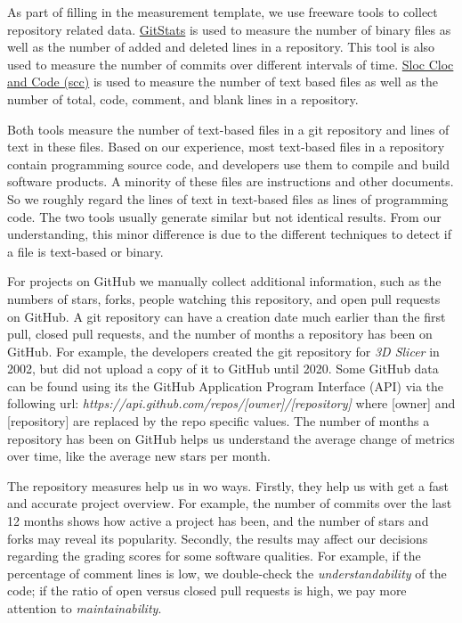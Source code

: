 \documentclass[final, 3p, times, authoryear]{elsarticle}
\begin{document}
As part of filling in the measurement template, we use freeware tools to collect
repository related data. \href{https://github.com/tomgi/git_stats}{GitStats}
\citep{Gieniusz2019} is used to measure the number of binary files as well as
the number of added and deleted lines in a repository. This tool is also used to
measure the number of commits over different intervals of time.
\href{https://github.com/boyter/scc}{Sloc Cloc and Code (scc)}
\citep{Boyter2021} is used to measure the number of text based files as well as
the number of total, code, comment, and blank lines in a repository.

Both tools measure the number of text-based files in a git repository and lines
of text in these files. Based on our experience, most text-based files in a
repository contain programming source code, and developers use them to compile
and build software products. A minority of these files are instructions and
other documents. So we roughly regard the lines of text in text-based files as
lines of programming code. The two tools usually generate similar but not
identical results. From our understanding, this minor difference is due to the
different techniques to detect if a file is text-based or binary.

For projects on GitHub we manually collect additional information, such as the
numbers of stars, forks, people watching this repository, and open pull requests
on GitHub. A git repository can have a creation date much earlier than the first
pull, closed pull requests, and the number of months a repository has been on
GitHub. For example, the developers created the git repository for \textit{3D
Slicer} in 2002, but did not upload a copy of it to GitHub until 2020. Some
GitHub data can be found using its the GitHub Application Program Interface
(API) via the following url:
\textit{https://api.github.com/repos/[owner]/[repository]} where [owner] and
[repository] are replaced by the repo specific values. The number of months a
repository has been on GitHub helps us understand the average change of metrics
over time, like the average new stars per month. 

The repository measures help us in wo ways. Firstly, they help us with get a
fast and accurate project overview. For example, the number of commits over the
last 12 months shows how active a project has been, and the number of stars and
forks may reveal its popularity. Secondly, the results may affect our decisions
regarding the grading scores for some software qualities. For example, if the
percentage of comment lines is low, we double-check the
\textit{understandability} of the code; if the ratio of open versus closed pull
requests is high, we pay more attention to \textit{maintainability}.
\end{document}

